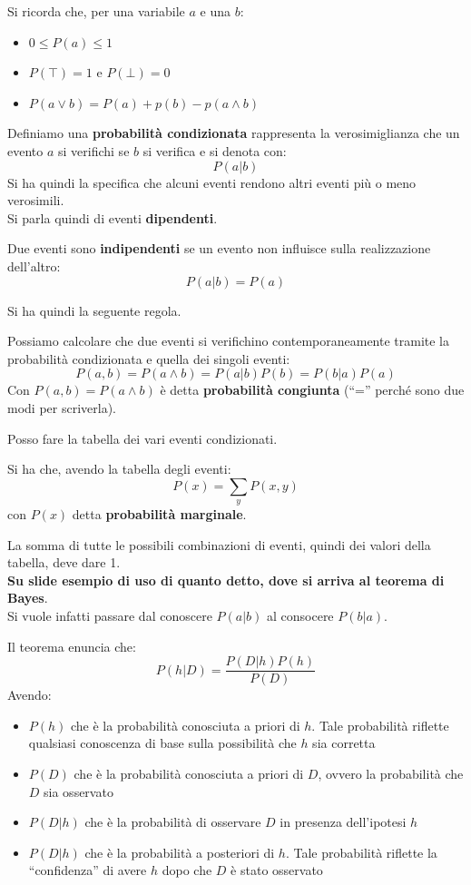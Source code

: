 \documentclass[a4paper,12pt, oneside]{book}
\begin{document}
Si ricorda che, per una variabile $a$ e una $b$:
\begin{itemize}
  \item $0\leq P(a)\leq 1$
  \item $P(\top)=1$ e $P(\bot) =0$
  \item $P(a\lor b) = P(a)+p(b) -p(a\land b)$
\end{itemize}
\begin{definizione}
  Definiamo una \textbf{probabilità condizionata} rappresenta la verosimiglianza
  che un evento $a$ si verifichi se $b$ si verifica e si denota con:
  \[P(a|b)\]
  Si ha quindi la specifica che alcuni eventi rendono altri eventi più o meno
  verosimili.\\
  Si parla quindi di eventi \textbf{dipendenti}.
\end{definizione}
\begin{definizione}
  Due eventi sono \textbf{indipendenti} se un evento non influisce sulla
  realizzazione dell'altro:
  \[P(a|b)=P(a)\]
\end{definizione}
Si ha quindi la seguente regola.
\begin{teorema}
  Possiamo calcolare che due eventi si verifichino contemporaneamente tramite la
  probabilità condizionata e quella dei singoli eventi:
  \[P(a,b)=P(a\land b)=P(a|b)P(b)=P(b|a)P(a)\]
  Con $P(a,b)=P(a\land b)$ è detta \textbf{probabilità congiunta} (``='' perché
  sono due modi per scriverla).
\end{teorema}
Posso fare la tabella dei vari eventi condizionati.
\begin{teorema}
  Si ha che, avendo la tabella degli eventi:
  \[P(x)=\sum_y P(x,y)\]
  con $P(x)$ detta \textbf{probabilità marginale}.
\end{teorema}
La somma di tutte le possibili combinazioni di eventi, quindi dei valori della
tabella, deve dare 1.\\ 
\textbf{Su slide esempio di uso di quanto detto, dove si arriva al teorema di
  Bayes}.\\
Si vuole infatti passare dal conoscere $P(a|b)$ al consocere $P(b|a)$.
\begin{teorema}
  Il teorema enuncia che:
  \[P(h|D)=\frac{P(D|h)P(h)}{P(D)}\]
  Avendo:
  \begin{itemize}
    \item $P(h)$ che è la probabilità conosciuta a priori di $h$. Tale
    probabilità riflette qualsiasi conoscenza di base sulla possibilità
    che $h$ sia corretta  
    \item $P(D)$ che è la probabilità conosciuta a priori di $D$, ovvero la
    probabilità che $D$ sia osservato
    \item $P(D|h)$ che è la probabilità di osservare $D$ in presenza
    dell'ipotesi $h$
    \item $P(D|h)$ che è la probabilità a posteriori di $h$. Tale probabilità
    riflette la ``confidenza'' di avere $h$  dopo che $D$ è stato osservato
  \end{itemize}
\end{teorema}
\end{document}
